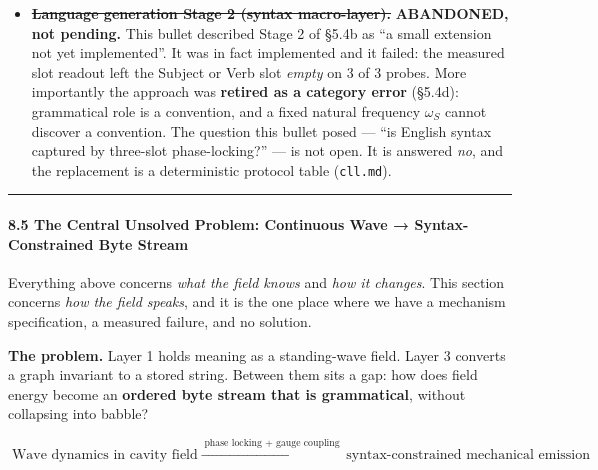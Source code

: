 \documentclass[
  11pt,
  a4paper,
]{article}
\begin{document}
\begin{itemize}
  Three \(O(E^2)\) defects on the ingest path were found and fixed while
  measuring this: \texttt{has\_edge} was a linear scan called from every
  \texttt{add\_edge} (making a bulk load quadratic),
  \texttt{would\_contradict} scanned all edges per asserted axiom, and
  four reasoning primitives performed their joins by full edge scan.
  Indexing them reduced load time by \(105\times\) at fixed output. None
  of this changes a claim in this paper; it changes what is runnable.
\item
  \st{\textbf{Language generation Stage 2 (syntax macro-layer).}}
  \textbf{ABANDONED, not pending.} This bullet described Stage 2 of
  §5.4b as ``a small extension not yet implemented''. It was in fact
  implemented and it failed: the measured slot readout left the Subject
  or Verb slot \emph{empty} on 3 of 3 probes. More importantly the
  approach was \textbf{retired as a category error} (§5.4d): grammatical
  role is a convention, and a fixed natural frequency \(\omega_S\)
  cannot discover a convention. The question this bullet posed --- ``is
  English syntax captured by three-slot phase-locking?'' --- is not
  open. It is answered \emph{no}, and the replacement is a deterministic
  protocol table (\texttt{cll.md}).
\end{itemize}

\begin{center}\rule{0.5\linewidth}{0.5pt}\end{center}

\paragraph{8.5 The Central Unsolved Problem: Continuous Wave →
Syntax-Constrained Byte
Stream}\label{the-central-unsolved-problem-continuous-wave-syntax-constrained-byte-stream}

Everything above concerns \emph{what the field knows} and \emph{how it
changes}. This section concerns \emph{how the field speaks}, and it is
the one place where we have a mechanism specification, a measured
failure, and no solution.

\textbf{The problem.} Layer 1 holds meaning as a standing-wave field.
Layer 3 converts a graph invariant to a stored string. Between them sits
a gap: how does field energy become an \textbf{ordered byte stream that
is grammatical}, without collapsing into babble?

\[
\text{Wave dynamics in cavity field}
\;\xrightarrow{\;\text{phase locking + gauge coupling}\;}\;
\text{syntax-constrained mechanical emission}
\]
\end{document}
